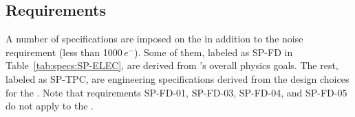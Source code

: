 \subsection{Requirements}
\label{sec:fdsp-tpcelec-overview-requirements}

A number of specifications are imposed on the  in addition to the noise requirement (less than \num{1000}\,$e^{-}$). 
Some of them, labeled as SP-FD in Table~\ref{tab:specs:SP-ELEC},
are derived from 's overall physics goals. %
The rest, labeled
as SP-TPC, are engineering specifications derived from the design choices for the . %
Note that requirements SP-FD-01, SP-FD-03, SP-FD-04, and SP-FD-05 do not 
apply to the . %



